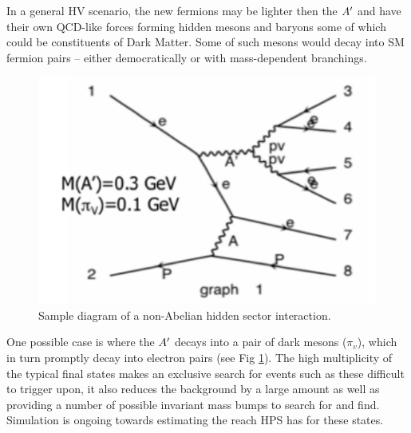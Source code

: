In a general HV scenario, the new fermions may be lighter then the $A^\prime$ and have their own QCD-like forces forming hidden mesons and baryons some of which could be constituents of Dark Matter. Some of such mesons would decay into SM fermion pairs – either democratically or with mass-dependent branchings. 
\begin{figure}
\includegraphics[scale=1]{measurements/multilepton-diagram.pdf}
\caption{Sample diagram of a non-Abelian hidden sector interaction.}
\label{fig:mldiagram}
\end{figure}
One possible  case is where the $A^\prime$ decays into a pair of dark mesons ($\pi_v$), which in turn promptly decay into electron pairs (see Fig \ref{fig:mldiagram}).  The high multiplicity of the typical final states makes an exclusive search for events such as these  difficult to trigger upon, it also reduces the background by a large amount as well as providing a number of possible invariant mass bumps to search for and find.  Simulation is ongoing towards estimating the reach HPS has for these states.  


